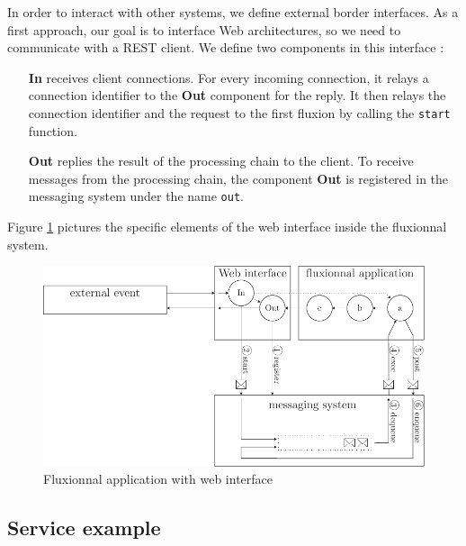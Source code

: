 In order to interact with other systems, we define external border interfaces.
As a first approach, our goal is to interface Web architectures, so we need to communicate with a REST\cite{Fielding2002} client.
We define two components in this interface :

\begin{itemize}
	\item[\textbf{In}]
    receives client connections.
    For every incoming connection, it relays a connection identifier to the \textbf{Out} component for the reply.
    It then relays the connection identifier and the request to the first fluxion by calling the \texttt{start} function.
	\item[\textbf{Out}]
    replies the result of the processing chain to the client.
    To receive messages from the processing chain, the component \textbf{Out} is registered in the messaging system under the name \texttt{out}.
\end{itemize}

Figure \ref{fig:schemaweb} pictures the specific elements of the web interface inside the fluxionnal system.

\begin{figure}[h!]
	\includegraphics[width=\linewidth]{ressources/schema-web.pdf}
	\caption{Fluxionnal application with web interface}
	\label{fig:schemaweb}
\end{figure}


\subsection{Service example}

